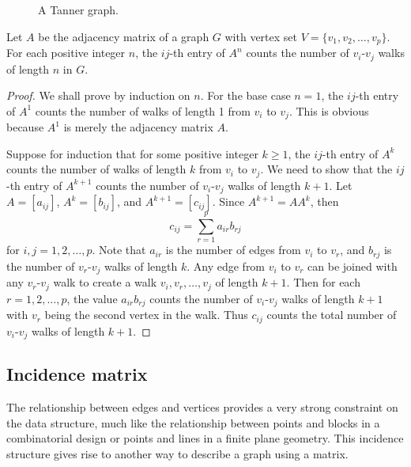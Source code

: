 \begin{figure}[!htbp]
\centering
{}

\caption{A Tanner graph.}
\label{fig:introduction:tanner_graph}
\end{figure}

\begin{theorem}
Let $A$ be the adjacency matrix of a graph $G$ with vertex set
$V = \{v_1, v_2, \dots, v_p\}$. For each positive integer $n$, the
$ij$-th entry of $A^n$ counts the number of $v_i$-$v_j$ walks of
length $n$ in $G$.
\end{theorem}

\begin{proof}
We shall prove by induction on $n$. For the base case $n = 1$, the
$ij$-th entry of $A^1$ counts the number of walks of length 1 from
$v_i$ to $v_j$. This is obvious because $A^1$ is merely the adjacency
matrix $A$.

Suppose for induction that for some positive integer $k \geq 1$, the
$ij$-th entry of $A^k$ counts the number of walks of length $k$ from
$v_i$ to $v_j$. We need to show that the $ij$-th entry of $A^{k+1}$
counts the number of $v_i$-$v_j$ walks of length $k + 1$. Let
$A = [a_{ij}]$, $A^k = [b_{ij}]$, and $A^{k+1} = [c_{ij}]$. Since
$A^{k+1} = A A^k$, then
\[
c_{ij}
=
\sum_{r=1}^p a_{ir} b_{rj}
\]
for $i,j = 1, 2, \dots, p$. Note that $a_{ir}$ is the number of edges
from $v_i$ to $v_r$, and $b_{rj}$ is the number of $v_r$-$v_j$ walks
of length $k$. Any edge from $v_i$ to $v_r$ can be joined with any
$v_r$-$v_j$ walk to create a walk $v_i, v_r, \dots, v_j$ of length
$k + 1$. Then for each $r = 1, 2, \dots, p$, the value $a_{ir} b_{rj}$
counts the number of $v_i$-$v_j$ walks of length $k + 1$ with $v_r$
being the second vertex in the walk. Thus $c_{ij}$ counts the total
number of $v_i$-$v_j$ walks of length $k + 1$.
\end{proof}



\subsection{Incidence matrix}

The relationship between edges and vertices provides a very strong
constraint on the data structure, much like the relationship between
points and blocks in a combinatorial design or points and lines in a
finite plane geometry. This incidence structure gives rise to another
way to describe a graph using a matrix.

